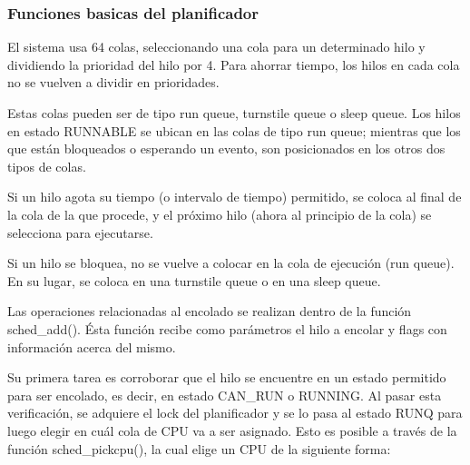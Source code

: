 \subsubsection*{Funciones basicas del planificador}


El sistema usa 64 colas, seleccionando una cola para un determinado hilo y dividiendo la prioridad del hilo por 4. Para ahorrar tiempo, los hilos en cada cola no se vuelven a dividir en prioridades.\par

Estas colas pueden ser de tipo run queue, turnstile queue o sleep queue. Los hilos en estado RUNNABLE se ubican en las colas de tipo run queue; mientras que los que están bloqueados o esperando un evento, son posicionados en los otros dos tipos de colas.\par

Si un hilo agota su tiempo (o intervalo de tiempo) permitido, se coloca al final de la cola de la que procede, y el próximo hilo (ahora al principio de la cola) se selecciona para ejecutarse.\par

Si un hilo se bloquea, no se vuelve a colocar en la cola de ejecución (run queue). En su lugar, se coloca en una turnstile queue o en una sleep queue.\par

Las operaciones relacionadas al encolado se realizan dentro de la función sched\_add(). Ésta función recibe como parámetros el hilo a encolar y flags con información acerca del mismo.\par

Su primera tarea es corroborar que el hilo se encuentre en un estado permitido para ser encolado, es decir, en estado CAN\_RUN o RUNNING. Al pasar esta verificación, se adquiere el lock del planificador y se lo pasa al estado RUNQ para luego elegir en cuál cola de CPU va a ser asignado. Esto es posible a través de la función sched\_pickcpu(), la cual elige un CPU de la siguiente forma:

